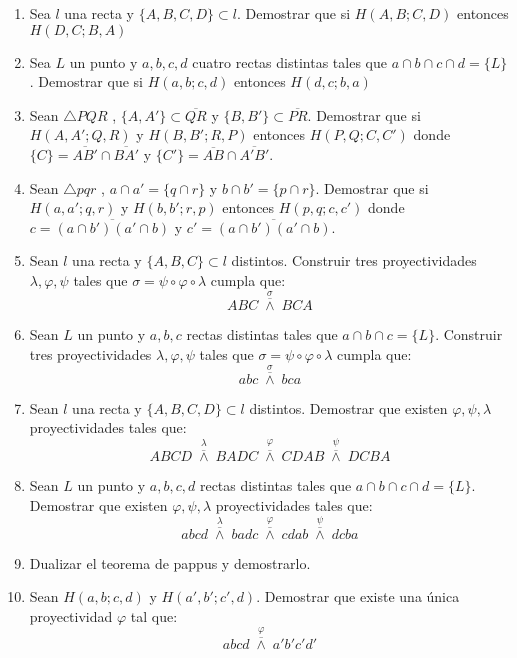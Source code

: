 \documentclass[12pts]{report}
\begin{document}
\begin{enumerate}
\item Sea $l$ una recta y $\{A,B,C,D\}\subset l$. Demostrar que si $H(A,B;C,D)$ entonces $H(D,C; B,A)$

\item Sea $L$ un punto y $a,b,c,d$ cuatro rectas distintas tales que $a\cap b\cap c\cap d =\{L\}$. Demostrar que si $H(a,b;c,d)$ entonces $H(d,c; b,a)$

\item Sean $\triangle PQR$ , $\{A,A'\}\subset \overline{QR}$ y $\{B, B'\}\subset \overline{PR}$. Demostrar que si $H(A,A';Q,R)$ y $H(B,B';R,P)$ entonces $H(P,Q;C,C')$ donde $\{C\}=\overline{AB'}\cap\overline{BA'}$ y $\{C'\}=\overline{AB}\cap\overline{A'B'}$.

\item Sean $\triangle pqr$ , $a\cap a'=\{ q\cap r\}$ y $b\cap b'=\{p\cap r\}$. Demostrar que si $H(a,a';q,r)$ y $H(b,b';r,p)$ entonces $H(p,q;c,c')$ donde $c=\overline{(a\cap b')(a'\cap b)}$ y $c'=\overline{(a\cap b')(a'\cap b)}$.


\item Sean $l$ una recta y $\{A,B,C\}\subset l$ distintos. Construir tres proyectividades  $\lambda, \varphi, \psi $ tales que $\sigma=\psi\circ\varphi\circ\lambda$ cumpla que:
$$ABC\;\overset{\sigma}{\overline{\wedge}}\; BCA$$

\item Sean $L$ un punto y $a, b , c$ rectas distintas tales que $a\cap b\cap c = \{L\}$. Construir tres proyectividades  $\lambda, \varphi, \psi $ tales que $\sigma=\psi\circ\varphi\circ\lambda$ cumpla que:
$$abc\;\overset{\sigma}{\overline{\wedge}}\; bca$$

\item Sean $l$ una recta y $\{A,B,C,D\}\subset l$ distintos. Demostrar que existen $\varphi, \psi, \lambda$ proyectividades tales que:
$$ABCD\; \overset{\lambda}{\overline{\wedge}}\; BADC\; \overset{\varphi}{\overline{\wedge}}\; CDAB \; \overset{\psi}{\overline{\wedge}}\;DCBA$$

\item Sean $L$ un punto y $a,b ,c ,d$ rectas distintas tales que $a\cap b\cap c\cap d=\{L\}$. Demostrar que existen $\varphi, \psi, \lambda$ proyectividades tales que:
$$abcd\; \overset{\lambda}{\overline{\wedge}}\; badc\; \overset{\varphi}{\overline{\wedge}}\; cdab \; \overset{\psi}{\overline{\wedge}}\;dcba$$

\item Dualizar el teorema de pappus y demostrarlo.

\item Sean $H(a,b;c,d)$ y $H(a',b';c',d)$. Demostrar que existe una única proyectividad $\varphi$ tal que:
$$abcd\;\overset{\varphi}{\overline{\wedge}}\; a'b'c'd'$$



\end{enumerate}
\end{document}
